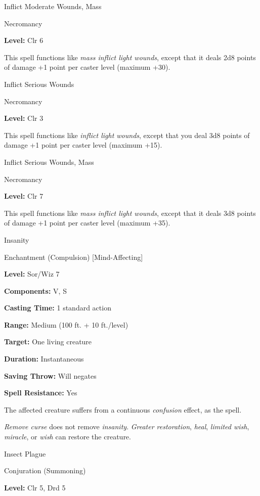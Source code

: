 \documentclass{article}
\begin{document}
\vspace{12pt}
Inflict Moderate Wounds, Mass

Necromancy

\textbf{Level:} Clr 6

This spell functions like \textit{mass inflict light wounds}, except that it deals 
2d8 points of damage +1 point per caster level (maximum +30).

\vspace{12pt}
Inflict Serious Wounds

Necromancy

\textbf{Level:} Clr 3

This spell functions like \textit{inflict light wounds}, except that you deal 3d8 
points of damage +1 point per caster level (maximum +15).

\vspace{12pt}
Inflict Serious Wounds, Mass

Necromancy

\textbf{Level:} Clr 7

This spell functions like \textit{mass inflict light wounds}, except that it deals 
3d8 points of damage +1 point per caster level (maximum +35).

\vspace{12pt}
Insanity

Enchantment (Compulsion) [Mind-Affecting]

\textbf{Level:} Sor/Wiz 7

\textbf{Components:} V, S

\textbf{Casting Time:} 1 standard action

\textbf{Range: }Medium (100 ft. + 10 ft./level)

\textbf{Target:} One living creature

\textbf{Duration:} Instantaneous

\textbf{Saving Throw: }Will negates

\textbf{Spell Resistance:} Yes

The affected creature suffers from a continuous \textit{confusion }effect, as the 
spell.

\textit{Remove curse }does not remove \textit{insanity}. \textit{Greater restoration}, 
\textit{heal}, \textit{limited wish}, \textit{miracle}, or \textit{wish }can restore 
the creature.

\vspace{12pt}
Insect Plague

Conjuration (Summoning)

\textbf{Level:} Clr 5, Drd 5
\end{document}
